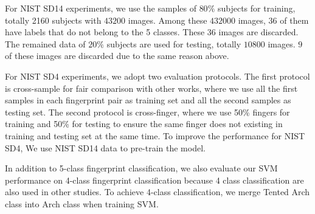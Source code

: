 %
For NIST SD14 experiments, we use the samples of $80\%$ subjects for training, totally 2160 subjects with $43200$ images. Among these $432000$ images, $36$ of them have labels that do not belong to the 5 classes. These $36$ images are discarded. 
The remained data of $20\%$ subjects are used for testing, totally $10800$ images. $9$ of these images are discarded due to the same reason above.
%

For NIST SD4 experiments,  we adopt two evaluation protocols. 
%
The first protocol is cross-sample for fair comparison with other works, where we use all the first samples in each fingerprint pair as training set and all the second samples as testing set.
%
The second protocol is cross-finger, where we use 50\% fingers for training and 50\% for testing to ensure the same finger does not existing in training and testing set at the same time. To improve the performance for NIST SD4, We use NIST SD14 data to pre-train the model.
 

In addition to 5-class fingerprint classification, we also evaluate our SVM performance on 4-class fingerprint classification because 4 class classification are also used in other studies. 
%
To achieve 4-class classification, we merge Tented Arch class into Arch class when training SVM.

